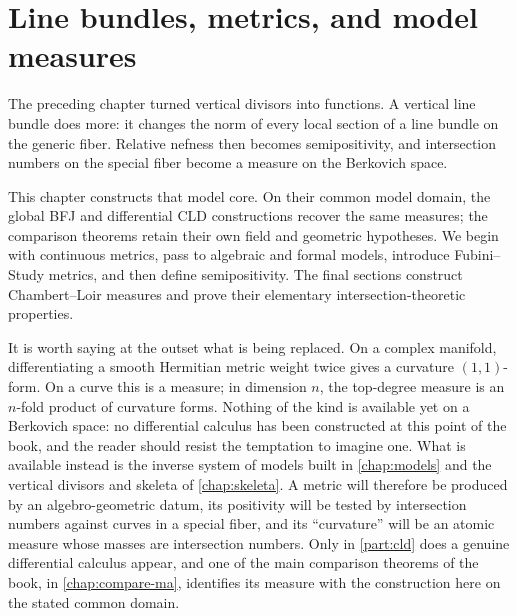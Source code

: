 \chapter{Line bundles, metrics, and model measures}
\label{chap:metrics}

The preceding chapter turned vertical divisors into functions. A vertical
line bundle does more: it changes the norm of every local section of a line
bundle on the generic fiber. Relative nefness then becomes semipositivity,
and intersection numbers on the special fiber become a measure on the
Berkovich space.

This chapter constructs that model core. On their common model domain, the
global BFJ and differential CLD constructions recover the same measures;
the comparison theorems retain their own field and geometric hypotheses.
We begin with continuous metrics, pass to algebraic and formal models,
introduce Fubini--Study metrics, and then define semipositivity. The final
sections construct Chambert--Loir measures and prove their elementary
intersection-theoretic properties.

It is worth saying at the outset what is being replaced. On a complex
manifold, differentiating a smooth Hermitian metric weight twice gives a
curvature $(1,1)$-form. On a curve this is a measure; in dimension $n$,
the top-degree measure is an $n$-fold product of curvature forms. Nothing
of the kind is available yet on a Berkovich space: no differential calculus
has been constructed at this point of the book, and the reader should resist
the temptation to imagine one. What is available instead is the inverse
system of models built in \cref{chap:models} and the vertical divisors and
skeleta of \cref{chap:skeleta}. A metric will therefore be produced by an
algebro-geometric datum, its positivity will be tested by intersection
numbers against curves in a special fiber, and its ``curvature'' will be an
atomic measure whose masses are intersection numbers. Only in
\cref{part:cld} does a genuine differential calculus appear, and one of the
main comparison theorems of the book, in \cref{chap:compare-ma}, identifies
its measure with the construction here on the stated common domain.

